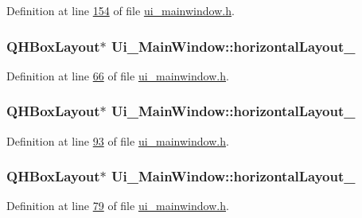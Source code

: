 Definition at line \hyperlink{a00052_source_l00154}{154} of file \hyperlink{a00052_source}{ui\+\_\+mainwindow.\+h}.

\hypertarget{a00027_a80867018070156432923d0266cc9fe25}{
\subsubsection[{horizontal\+Layout\+\_\+2}]{\setlength{\rightskip}{0pt plus 5cm}Q\+H\+Box\+Layout$\ast$ Ui\+\_\+\+Main\+Window\+::horizontal\+Layout\+\_}}\label{a00027_a80867018070156432923d0266cc9fe25}


Definition at line \hyperlink{a00052_source_l00066}{66} of file \hyperlink{a00052_source}{ui\+\_\+mainwindow.\+h}.

\hypertarget{a00027_a2071e5a4c77a64f74d74ac246bbc683c}{
\subsubsection[{horizontal\+Layout\+\_\+22}]{\setlength{\rightskip}{0pt plus 5cm}Q\+H\+Box\+Layout$\ast$ Ui\+\_\+\+Main\+Window\+::horizontal\+Layout\+\_}}\label{a00027_a2071e5a4c77a64f74d74ac246bbc683c}


Definition at line \hyperlink{a00052_source_l00093}{93} of file \hyperlink{a00052_source}{ui\+\_\+mainwindow.\+h}.

\hypertarget{a00027_a17c8bb967f8ecc58406ac7ca1bec7b7e}{
\subsubsection[{horizontal\+Layout\+\_\+23}]{\setlength{\rightskip}{0pt plus 5cm}Q\+H\+Box\+Layout$\ast$ Ui\+\_\+\+Main\+Window\+::horizontal\+Layout\+\_}}\label{a00027_a17c8bb967f8ecc58406ac7ca1bec7b7e}


Definition at line \hyperlink{a00052_source_l00079}{79} of file \hyperlink{a00052_source}{ui\+\_\+mainwindow.\+h}.


